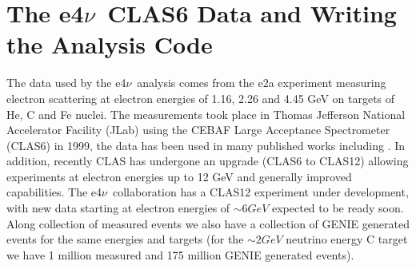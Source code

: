 \documentclass[a4paper,12pt]{article}
\newcommand{\efn}{e4$\nu$}
\begin{document}
\section{The \efn\ CLAS6 Data and Writing the Analysis Code}
The data used by the \efn\ analysis comes from the e2a experiment measuring electron scattering at electron energies of 1.16, 2.26 and 4.45 \si{GeV} on targets of He, C and Fe nuclei.
The measurements took place in Thomas Jefferson National Accelerator Facility (JLab) using the CEBAF Large Acceptance Spectrometer (CLAS6) \cite{meckingCEBAFLargeAcceptance2003} in 1999, the data has been used in many published works including \cite{khachatryanElectronbeamEnergyReconstruction2021}.
In addition, recently CLAS has undergone an upgrade (CLAS6 to CLAS12) \cite{burkertCLAS12SpectrometerJefferson2020} allowing experiments at electron energies up to 12 \si{GeV} and generally improved capabilities.
The \efn\ collaboration has a CLAS12 experiment under development, with new data starting at electron energies of $\sim6 \si{GeV}$ expected to be ready soon.
Along collection of measured events we also have a collection of GENIE generated events for the same energies and targets (for the $\sim 2\si{GeV}$ neutrino energy C target we have 1 million measured and 175 million GENIE generated events).
\end{document}
